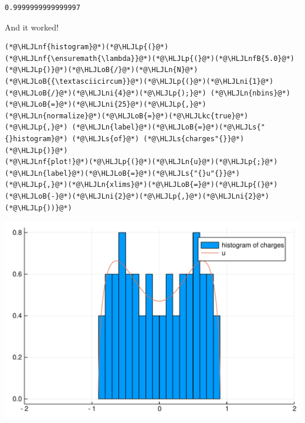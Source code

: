 \documentclass[12pt,a4paper]{article}
\newcommand{\HLJLkc}[1]{\textcolor[RGB]{59,151,46}{\textit{#1}}}
\newcommand{\HLJLn}[1]{#1}
\newcommand{\HLJLnf}[1]{\textcolor[RGB]{66,102,213}{#1}}
\newcommand{\HLJLs}[1]{\textcolor[RGB]{201,61,57}{#1}}
\newcommand{\HLJLnfB}[1]{\textcolor[RGB]{59,151,46}{#1}}
\newcommand{\HLJLni}[1]{\textcolor[RGB]{59,151,46}{#1}}
\newcommand{\HLJLoB}[1]{\textcolor[RGB]{102,102,102}{\textbf{#1}}}
\newcommand{\HLJLp}[1]{#1}
\begin{document}
\begin{lstlisting}
0.9999999999999997
\end{lstlisting}


And it worked!


\begin{lstlisting}
(*@\HLJLnf{histogram}@*)(*@\HLJLp{(}@*)(*@\HLJLnf{\ensuremath{\lambda}}@*)(*@\HLJLp{(}@*)(*@\HLJLnfB{5.0}@*)(*@\HLJLp{)}@*)(*@\HLJLoB{/}@*)(*@\HLJLn{N}@*)(*@\HLJLoB{{\textasciicircum}}@*)(*@\HLJLp{(}@*)(*@\HLJLni{1}@*)(*@\HLJLoB{/}@*)(*@\HLJLni{4}@*)(*@\HLJLp{);}@*) (*@\HLJLn{nbins}@*)(*@\HLJLoB{=}@*)(*@\HLJLni{25}@*)(*@\HLJLp{,}@*) (*@\HLJLn{normalize}@*)(*@\HLJLoB{=}@*)(*@\HLJLkc{true}@*)(*@\HLJLp{,}@*) (*@\HLJLn{label}@*)(*@\HLJLoB{=}@*)(*@\HLJLs{"{}histogram}@*) (*@\HLJLs{of}@*) (*@\HLJLs{charges"{}}@*)(*@\HLJLp{)}@*)
(*@\HLJLnf{plot!}@*)(*@\HLJLp{(}@*)(*@\HLJLn{u}@*)(*@\HLJLp{;}@*) (*@\HLJLn{label}@*)(*@\HLJLoB{=}@*)(*@\HLJLs{"{}u"{}}@*)(*@\HLJLp{,}@*)(*@\HLJLn{xlims}@*)(*@\HLJLoB{=}@*)(*@\HLJLp{(}@*)(*@\HLJLoB{-}@*)(*@\HLJLni{2}@*)(*@\HLJLp{,}@*)(*@\HLJLni{2}@*)(*@\HLJLp{))}@*)
\end{lstlisting}

\includegraphics[width=\linewidth]{figures/Solutions2_42_1.pdf}
\end{document}
